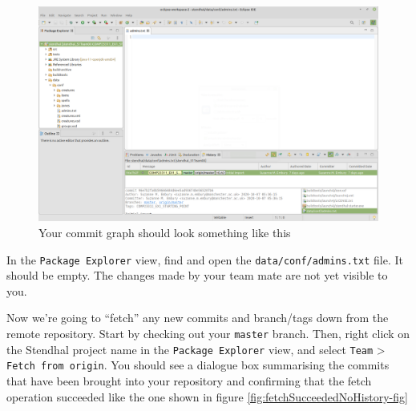 \documentclass[
]{book}
\begin{document}
\begin{figure}

{\centering \includegraphics[width=1\linewidth]{images/teamMatesLocalCommitGraphBeforeFetchNoHistory} 

}

\caption{Your commit graph should look something like this}\label{fig:teamMatesLocalCommitGraphBeforeFetchNoHistory-fig}
\end{figure}

In the \texttt{Package\ Explorer} view, find and open the \texttt{data/conf/admins.txt} file. It should be empty. The changes made by your team mate are not yet visible to you.

Now we're going to ``fetch'' any new commits and branch/tags down from the remote repository. Start by checking out your \texttt{master} branch. Then, right click on the Stendhal project name in the \texttt{Package\ Explorer} view, and select \texttt{Team} \textgreater{} \texttt{Fetch\ from\ origin}. You should see a dialogue box summarising the commits that have been brought into your repository and confirming that the fetch operation succeeded like the one shown in figure \ref{fig:fetchSucceededNoHistory-fig}
\end{document}
